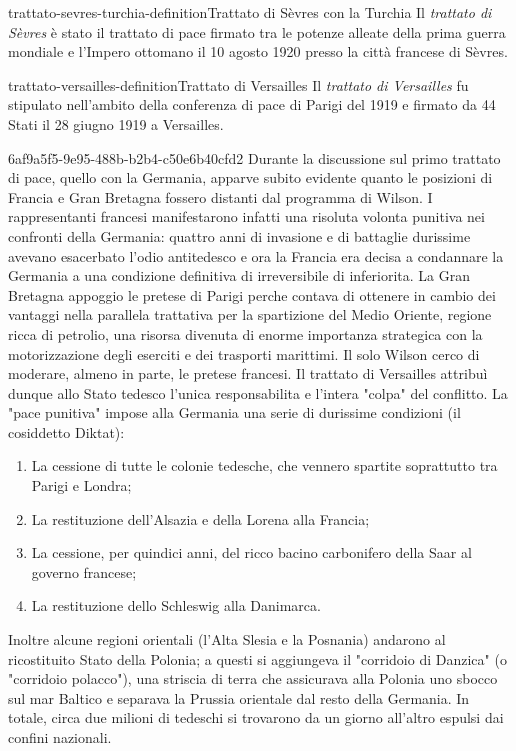 \documentclass[preview]{standalone}
\begin{document}
\begin{snippetdefinition}{trattato-sevres-turchia-definition}{Trattato di Sèvres con la Turchia}
    Il \textit{trattato di Sèvres} è stato il trattato di pace firmato
    tra le potenze alleate della prima guerra mondiale e l'Impero ottomano il
    10 agosto 1920 presso la città francese di Sèvres.
\end{snippetdefinition}

\begin{snippetdefinition}{trattato-versailles-definition}{Trattato di Versailles}
    Il \textit{trattato di Versailles} fu stipulato nell'ambito
    della conferenza di pace di Parigi del 1919 e firmato da 44
    Stati il 28 giugno 1919 a Versailles.
\end{snippetdefinition}

\begin{snippet}{6af9a5f5-9e95-488b-b2b4-c50e6b40cfd2}
    Durante la discussione sul primo trattato di pace, quello con la Germania, apparve subito
    evidente quanto le posizioni di Francia e Gran Bretagna fossero distanti dal programma di
    Wilson. I rappresentanti francesi manifestarono infatti una risoluta volonta punitiva nei
    confronti della Germania: quattro anni di invasione e di battaglie durissime avevano esacerbato
    l'odio antitedesco e ora la Francia era decisa a condannare la Germania a una condizione
    definitiva di irreversibile di inferiorita.
    La Gran Bretagna appoggio le pretese di Parigi perche contava di ottenere in cambio dei
    vantaggi nella parallela trattativa per la spartizione del Medio Oriente, regione ricca di petrolio,
    una risorsa divenuta di enorme importanza strategica con la motorizzazione degli eserciti e dei
    trasporti marittimi. Il solo Wilson cerco di moderare, almeno in parte, le pretese francesi. Il
    trattato di Versailles attribuì dunque allo Stato tedesco l'unica responsabilita e l'intera "colpa"
    del conflitto. La "pace punitiva" impose alla Germania una serie di durissime condizioni (il
    cosiddetto Diktat):
    \begin{enumerate}
        \item La cessione di tutte le colonie tedesche, che vennero spartite soprattutto tra Parigi e
        Londra;
        \item La restituzione dell'Alsazia e della Lorena alla Francia;
        \item La cessione, per quindici anni, del ricco bacino carbonifero della Saar al governo
        francese;
        \item La restituzione dello Schleswig alla Danimarca.
    \end{enumerate}
    Inoltre alcune regioni orientali (l'Alta Slesia e la Posnania) andarono al ricostituito Stato della
    Polonia; a questi si aggiungeva il "corridoio di Danzica" (o "corridoio polacco"), una striscia di
    terra che assicurava alla Polonia uno sbocco sul mar Baltico e separava la Prussia orientale dal
    resto della Germania.
    In totale, circa due milioni di tedeschi si trovarono da un giorno all'altro espulsi dai confini
    nazionali.
    

\end{snippet}
\end{document}
